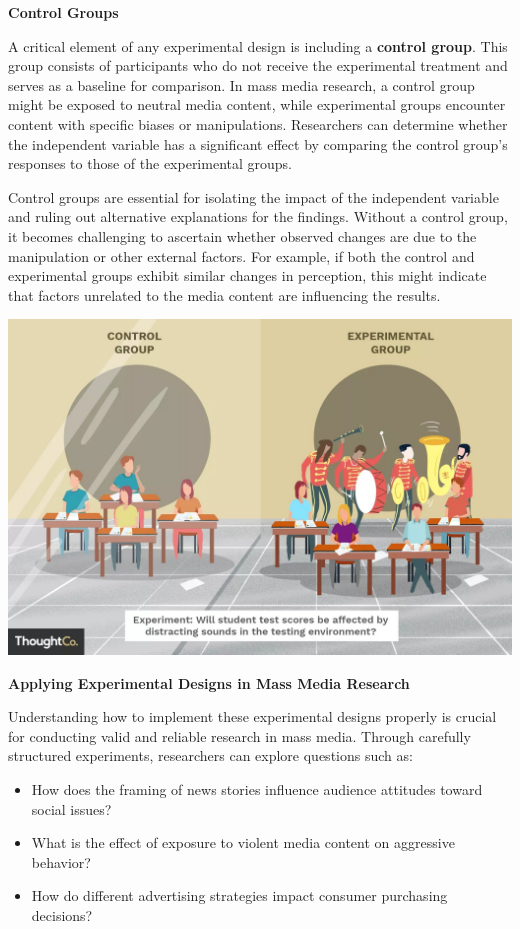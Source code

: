 \documentclass[
]{book}
\providecommand{\tightlist}{%
  \setlength{\itemsep}{0pt}\setlength{\parskip}{0pt}}
\begin{document}
\textbf{Control Groups}

A critical element of any experimental design is including a \textbf{control group}. This group consists of participants who do not receive the experimental treatment and serves as a baseline for comparison. In mass media research, a control group might be exposed to neutral media content, while experimental groups encounter content with specific biases or manipulations. Researchers can determine whether the independent variable has a significant effect by comparing the control group's responses to those of the experimental groups.

Control groups are essential for isolating the impact of the independent variable and ruling out alternative explanations for the findings. Without a control group, it becomes challenging to ascertain whether observed changes are due to the manipulation or other external factors. For example, if both the control and experimental groups exhibit similar changes in perception, this might indicate that factors unrelated to the media content are influencing the results.

\href{https://www.thoughtco.com/control-and-experimental-group-differences-606113}{\includegraphics[width=1\textwidth,height=\textheight]{images/control.jpg}}

\textbf{Applying Experimental Designs in Mass Media Research}

Understanding how to implement these experimental designs properly is crucial for conducting valid and reliable research in mass media. Through carefully structured experiments, researchers can explore questions such as:

\begin{itemize}
\tightlist
\item
  How does the framing of news stories influence audience attitudes toward social issues?
\item
  What is the effect of exposure to violent media content on aggressive behavior?
\item
  How do different advertising strategies impact consumer purchasing decisions?
\end{itemize}
\end{document}
